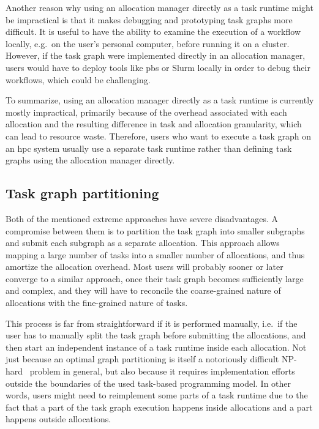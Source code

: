 Another reason why using an allocation manager directly as a task runtime might be impractical is
that it makes debugging and prototyping task graphs more difficult. It is useful to have the
ability to examine the execution of a workflow locally, e.g.\ on the user's personal computer,
before running it on a cluster. However, if the task graph were implemented directly in an
allocation manager, users would have to deploy tools like \gls{pbs} or Slurm locally
in order to debug their workflows, which could be challenging.

To summarize, using an allocation manager directly as a task runtime is currently mostly
impractical, primarily because of the overhead associated with each allocation and the resulting
difference in task and allocation granularity, which can lead to resource waste. Therefore, users
who want to execute a task graph on an \gls{hpc} system usually use a separate task
runtime rather than defining task graphs using the allocation manager directly.

\subsection*{Task graph partitioning}
Both of the mentioned extreme approaches have severe disadvantages. A compromise between them is to
partition the task graph into smaller subgraphs and submit each subgraph as a separate allocation.
This approach allows mapping a large number of tasks into a smaller number of allocations, and thus
amortize the allocation overhead. Most users will probably sooner or later converge to a similar
approach, once their task graph becomes sufficiently large and complex, and they will have to
reconcile the coarse-grained nature of allocations with the fine-grained nature of tasks.

This process is far from straightforward if it is performed manually, i.e.\ if the user has to
manually split the task graph before submitting the allocations, and then start an independent
instance of a task runtime inside each allocation. Not just because an optimal graph partitioning
is itself a notoriously difficult NP-hard~\cite{graph_partitioning} problem in general, but also
because it requires implementation efforts outside the boundaries of the used task-based
programming model. In other words, users might need to reimplement some parts of a task runtime due
to the fact that a part of the task graph execution happens inside allocations and a part happens
outside allocations.

